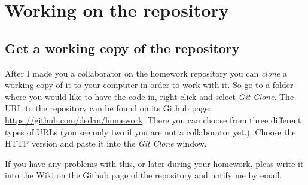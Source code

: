 \documentclass[]{article}
\begin{document}
\section{Working on the repository} %
\label{sg:sec:working_on_the_repository}

\subsection{Get a working copy of the repository} %
\label{sg:sub:get_a_working_copy_of_the_repository}

After I made you a collaborator on the homework repository you can \emph{clone} a working copy of it to your computer in order to work with it. So go to a folder where you would like to have the code in, right-click and select \emph{Git Clone}. The URL to the repository can be found on its Github page: \url{https://github.com/dedan/homework}. There you can choose from three different types of URLs (you see only two if you are not a collaborator yet.). Choose the HTTP version and paste it into the \emph{Git Clone} window.

If you have any problems with this, or later during your homework, pleas write it into the Wiki on the Github page of the repository and notify me by email.




\end{document}
